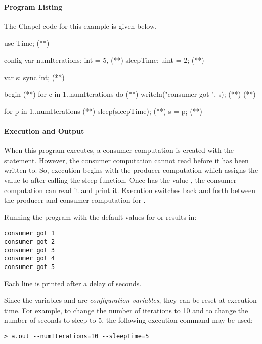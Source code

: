 \paragraph{Program Listing}
The Chapel code for this example is given below.

\begin{numberedchapel}
use Time;                           (*\label{use_time}*)

config var numIterations: int = 5,  (*\label{prodcons_var_1}*)
           sleepTime: uint = 2;     (*\label{prodcons_var_2}*)

var s: sync int;                    (*\label{prodcons_var_3}*)

begin {                                (*\label{consumer_start}*)
  for c in 1..numIterations do         (*\label{consumer_for_1}*)
    writeln("consumer got ", s);       (*\label{consumer_for_2}*)
}                                      (*\label{consumer_end}*)

for p in 1..numIterations {            (*\label{producer_start}*)
  sleep(sleepTime);   (*\label{sleep_call}*)
  s = p;
}                                      (*\label{producer_end}*)
\end{numberedchapel}

\paragraph{Execution and Output}
When this program executes, a consumer computation is created with the 
statement.
However, the consumer computation cannot read  before it has been written
to.  So, execution begins with the producer computation which assigns the value
 to  after calling the sleep function.  Once  has the
value , the consumer computation can read it and print it.  Execution
switches back and forth between the producer and consumer computation for
.

Running the program with the default
values for  or  results in:
{\small
\begin{verbatim}
consumer got 1
consumer got 2
consumer got 3
consumer got 4
consumer got 5
\end{verbatim}}
Each line is printed after a delay of  seconds.

Since the variables  and  are 
{\em configuration variables}, they can be reset at execution time.
For example, to change the number of iterations to 10
and to change the number of seconds to sleep to 5, the following execution command
may be used:
{\small
\begin{verbatim}
> a.out --numIterations=10 --sleepTime=5
\end{verbatim}}

